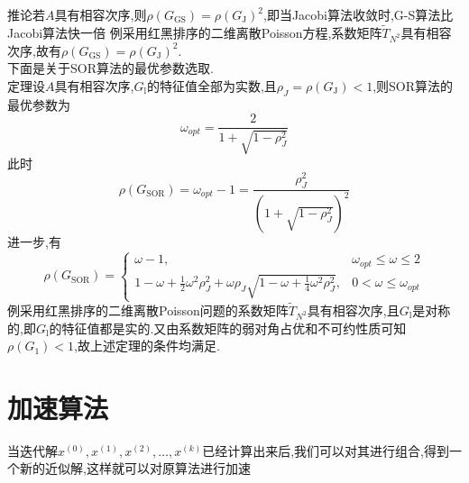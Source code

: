 \documentclass[12pt,a4paper]{article}
\begin{document}
{\color{blue}推论}\quad 若$A$具有相容次序,则$\rho\left(G_{\mathrm{GS}}\right)=\rho\left(G_{\mathrm{J}}\right)^{2}$,即当Jacobi算法收敛时,G-S算法比Jacobi算法快一倍
{\color{blue}例}\qquad 采用红黑排序的二维离散Poisson方程,系数矩阵$\tilde{T}_{N^{2}}$具有相容次序,故有$\rho\left(G_{\mathrm{GS}}\right)=\rho\left(G_{\mathrm{J}}\right)^{2}$.\\
下面是关于SOR算法的最优参数选取.\\
{\color{blue}定理}\qquad 设$A$具有相容次序,$G_{\mathrm{l}}$的特征值全部为实数,且$\rho_{J}=\rho\left(G_{\mathrm{J}}\right)<1$,则SOR算法的最优参数为
$$
\omega_{o p t}=\frac{2}{1+\sqrt{1-\rho_{J}^{2}}}
$$
此时
$$
\rho\left(G_{\mathrm{SOR}}\right)=\omega_{o p t}-1=\frac{\rho_{J}^{2}}{\left(1+\sqrt{1-\rho_{J}^{2}}\right)^{2}}
$$
进一步,有
$$
\rho\left(G_{\mathrm{SOR}}\right)=\left\{\begin{array}{ll}{\omega-1,} & {\omega_{o p t} \leq \omega \leq 2} \\ {1-\omega+\frac{1}{2} \omega^{2} \rho_{J}^{2}+\omega \rho_{J} \sqrt{1-\omega+\frac{1}{4} \omega^{2} \rho_{J}^{2}},} & {0<\omega \leq \omega_{o p t}}\end{array}\right.
$$
{\color{blue}例}\qquad 采用红黑排序的二维离散Poisson问题的系数矩阵$\tilde{T}_{N^{2}}$具有相容次序,且$G_{\mathrm{l}}$是对称的,即$G_{\mathrm{l}}$的特征值都是实的.又由系数矩阵的弱对角占优和不可约性质可知$\rho\left(G_{1}\right)<1$,故上述定理的条件均满足.
\section{\color{blue}加速算法}
当迭代解$x^{(0)}, x^{(1)}, x^{(2)}, \ldots, x^{(k)}$已经计算出来后,我们可以对其进行组合,得到一个新的近似解,这样就可以对原算法进行加速
\end{document}
